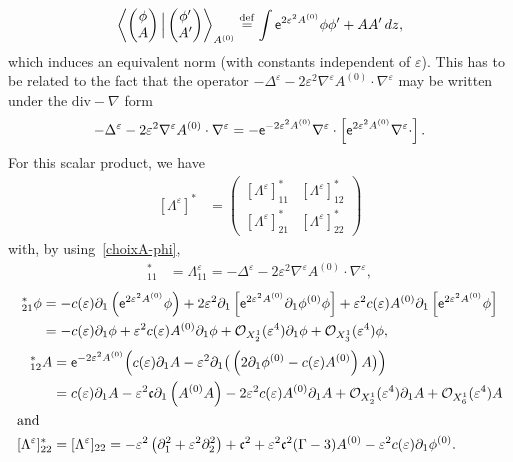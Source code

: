 \documentclass[AHL,Unicode,longabstracts,published]{cedram}
\newcommand*\p{\partial}
\newcommand*\ddef{\stackrel{\rm def}{=}}
\newcommand{\divv}{\mathrm{div}}
\newcommand*\BO{\mathcal{O}}
\newcommand*\ex{{\sf e}}
\newcommand*\cs{{\mathfrak c}}
\newcommand*\e{\varepsilon}
\begin{document}
\[
\left\langle
\begin{pmatrix} \phi \\ A
\end{pmatrix} \Big|
\begin{pmatrix} \phi' \\ A'
\end{pmatrix} \right\rangle_{A^{(0)}}
\ddef \int \ex^{ 2 \e^2 A^{(0)} } \phi \phi' + A A' \, dz,
\]
which induces an equivalent norm (with constants independent of $ \e $). This has to be related to the fact that the operator $ - \Delta^\e - 2 \e^2 \nabla^\e A^{(0)} \cdot \nabla^\e $ may be written under the $ \divv - \nabla $ form
\[
- \Delta^\e - 2 \e^2 \nabla^\e A^{(0)} \cdot \nabla^\e = - \ex^{- 2 \e^2 A^{(0)} } \nabla^\e \cdot \left[\ex^{2 \e^2 A^{(0)} } \nabla^\e \cdot\right].
\]
For this scalar product, we have
\begin{align*}
\left[\Lambda^\e\right]^* & =
\begin{pmatrix}
[\Lambda^\e]^*_{11} & [\Lambda^\e]^*_{12} \\
[\Lambda^\e]^{*}_{21} & [\Lambda^\e]^{*}_{22}
\end{pmatrix}
\end{align*}
with, by using~\eqref{choixA-phi},
\begin{align*}
[\Lambda^\e]^{*}_{11} & = \Lambda^\e_{11} = - \Delta^\e - 2 \e^2 \nabla^\e A^{(0)} \cdot \nabla^\e,
\end{align*}
\begin{align*}
[\Lambda^\e]^{*}_{21} \phi & = - c(\e) \p_{1} \left(\ex^{ 2 \e^2 A^{(0)} } \phi\right) + 2 \e^2 \p_1 \left[\ex^{ 2 \e^2 A^{(0)} } \p_1 \phi^{(0)} \phi\right] + \e^2 c(\e) A^{(0)} \p_1 \left[\ex^{ 2 \e^2 A^{(0)} } \phi\right]
\\ & = - c(\e) \p_{1} \phi + \e^2 c(\e) A^{(0)} \p_1 \phi + \BO_{X^1_2} (\e^4) \p_1 \phi + \BO_{X^1_3} (\e^4) \phi,
\end{align*}
\begin{align*}
[\Lambda^\e]^{*}_{12} A & = \ex^{-2 \e^2 A^{(0)} } \Big(c(\e) \p_{1} A - \e^2 \p_1 \big(\left(2 \p_{1} \phi^{(0)} - c(\e) A^{(0)}\right) A \big) \Big)
\\ & = c(\e) \p_{1} A - \e^2 \cs \p_1 \left(A^{(0)} A\right) - 2 \e^2 c(\e) A^{(0)} \p_1 A + \BO_{X^1_2} (\e^4) \p_1 A + \BO_{X^1_6} (\e^4) A
\\
\intertext{and}
[\Lambda^\e]^{*}_{22} & = [\Lambda^\e]_{22} = - \e^2 \left(\p_{1}^2 + \e^2 \p_{2}^2\right) + \cs^2 + \e^2 \cs^2 (\Gamma -3) A^{(0)} - \e^2 c(\e) \p_1 \phi^{(0)}.
\end{align*}
\end{document}

